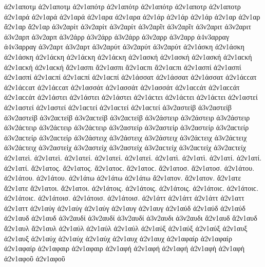 {ἀ2ν1αποτμ ἀ2ν1αποτμ 
ἀ2ν1απότρ ἀ2ν1απότρ ἀ2ν1απότρ   %
ἀ2ν1αποτρ ἀ2ν1αποτρ 
ἀ2ν1αρά ἀ2ν1αρά ἀ2ν1αρά   %
ἀ2ν1αρα ἀ2ν1αρα 
ἀ2ν1άρ ἀ2ν1άρ ἀ2ν1άρ   %
ἀ2ν1αρ ἀ2ν1αρ 
ἄ2ν1αρ ἄ2ν1αρ   %
ἀ3ν2αρίτ ἀ3ν2αρίτ ἀ3ν2αρίτ   %
ἀ3ν2αρῖτ ἀ3ν2αρῖτ   %
ἀ3ν2αριτ ἀ3ν2αριτ   %
ἀ3ν2αρπ ἀ3ν2αρπ   %
ἀ3ν2άρρ ἀ3ν2άρρ ἀ3ν2άρρ   %
ἀ3ν2αρρ ἀ3ν2αρρ 
ἀ4ν3αρραγ ἀ4ν3αρραγ   %
ἀ3ν2αρτ ἀ3ν2αρτ   %
ἀ3ν2αρύτ ἀ3ν2αρύτ ἀ3ν2αρύτ   %
ἀ2ν1άσκη ἀ2ν1άσκη ἀ2ν1άσκη ἀ2ν1άϲκη ἀ2ν1άϲκη ἀ2ν1άϲκη   %
ἀ2ν1ασκή ἀ2ν1ασκή ἀ2ν1ασκή ἀ2ν1αϲκή ἀ2ν1αϲκή ἀ2ν1αϲκή 
ἄ2ν1ασπι ἄ2ν1ασπι ἄ2ν1αϲπι ἄ2ν1αϲπι   %
ἀ2ν1ασπί ἀ2ν1ασπί ἀ2ν1ασπί ἀ2ν1αϲπί ἀ2ν1αϲπί ἀ2ν1αϲπί 
ἀ2ν1άσσατ ἀ2ν1άσσατ ἀ2ν1άσσατ ἀ2ν1άϲϲατ ἀ2ν1άϲϲατ ἀ2ν1άϲϲατ   %
ἀ2ν1ασσάτ ἀ2ν1ασσάτ ἀ2ν1ασσάτ ἀ2ν1αϲϲάτ ἀ2ν1αϲϲάτ ἀ2ν1αϲϲάτ 
ἀ2ν1άστει ἀ2ν1άστει ἀ2ν1άστει ἀ2ν1άϲτει ἀ2ν1άϲτει ἀ2ν1άϲτει   %
ἀ2ν1αστεί ἀ2ν1αστεί ἀ2ν1αστεί ἀ2ν1αϲτεί ἀ2ν1αϲτεί ἀ2ν1αϲτεί 
ἀ3ν2αστείβ ἀ3ν2αστείβ ἀ3ν2αστείβ ἀ3ν2αϲτείβ ἀ3ν2αϲτείβ ἀ3ν2αϲτείβ   %
ἀ3ν2άστειρ ἀ3ν2άστειρ ἀ3ν2άστειρ ἀ3ν2άϲτειρ ἀ3ν2άϲτειρ ἀ3ν2άϲτειρ   %
ἀ3ν2αστείρ ἀ3ν2αστείρ ἀ3ν2αστείρ ἀ3ν2αϲτείρ ἀ3ν2αϲτείρ ἀ3ν2αϲτείρ 
ἀ3ν2άστειχ ἀ3ν2άστειχ ἀ3ν2άστειχ ἀ3ν2άϲτειχ ἀ3ν2άϲτειχ ἀ3ν2άϲτειχ   %
ἀ3ν2αστείχ ἀ3ν2αστείχ ἀ3ν2αστείχ ἀ3ν2αϲτείχ ἀ3ν2αϲτείχ ἀ3ν2αϲτείχ 
ἀ2ν1ατεὶ. ἀ2ν1ατεὶ.   %
ἀ2ν1ατεί. ἀ2ν1ατεί. ἀ2ν1ατεί. 
ἀ2ν1ατὶ. ἀ2ν1ατὶ.   %
ἀ2ν1ατί. ἀ2ν1ατί. ἀ2ν1ατί. 
ἄ2ν1ατος. ἄ2ν1ατος. ἄ2ν1ατοϲ. ἄ2ν1ατοϲ.   %
ἄ2ν1ατοσ. ἄ2ν1ατοσ. 
ἀ2ν1άτου. ἀ2ν1άτου. ἀ2ν1άτου. 
ἀ2ν1άτω ἀ2ν1άτω ἀ2ν1άτω 
ἄ2ν1ατον. ἄ2ν1ατον. 
ἄ2ν1ατε ἄ2ν1ατε 
ἄ2ν1ατοι. ἄ2ν1ατοι. 
ἀ2ν1άτοις. ἀ2ν1άτοις. ἀ2ν1άτοις. ἀ2ν1άτοιϲ. ἀ2ν1άτοιϲ. ἀ2ν1άτοιϲ. 
ἀ2ν1άτοισ. ἀ2ν1άτοισ. ἀ2ν1άτοισ. 
ἀ2ν1άττ ἀ2ν1άττ ἀ2ν1άττ   %
ἀ2ν1αττ ἀ2ν1αττ 
ἀ2ν1αύγ ἀ2ν1αύγ ἀ2ν1αύγ   %
ἀ2ν1αυγ ἀ2ν1αυγ 
ἀ2ν1αύδ ἀ2ν1αύδ ἀ2ν1αύδ   %
ἀ2ν1αυδ ἀ2ν1αυδ 
ἀ3ν2αυδί ἀ3ν2αυδί ἀ3ν2αυδί   %
ἀ3ν2αυδι ἀ3ν2αυδι 
ἄ2ν1αυδ ἄ2ν1αυδ   %
ἄ2ν1αυλ ἄ2ν1αυλ   %
ἀ2ν1αύλ ἀ2ν1αύλ ἀ2ν1αύλ 
ἀ2ν1αύξ ἀ2ν1αύξ ἀ2ν1αύξ   %
ἀ2ν1αυξ ἀ2ν1αυξ 
ἀ2ν1αύχ ἀ2ν1αύχ ἀ2ν1αύχ   %
ἀ2ν1αυχ ἀ2ν1αυχ 
ἀ2ν1αφαίρ ἀ2ν1αφαίρ ἀ2ν1αφαίρ   %
ἀ2ν1αφαιρ ἀ2ν1αφαιρ 
ἀ2ν1αφή ἀ2ν1αφή ἀ2ν1αφή   %
ἀ2ν1αφὴ ἀ2ν1αφὴ 
ἀ2ν1αφοῦ ἀ2ν1αφοῦ 
}
